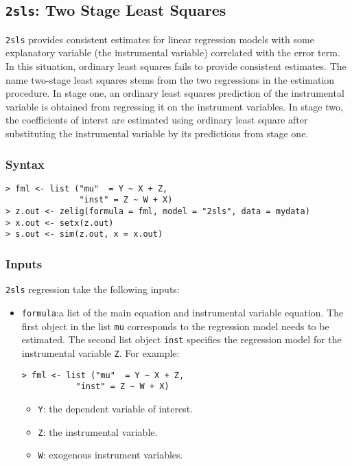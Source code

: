 \documentclass[12pt]{book}%
\begin{document}
\subsection{\texttt{2sls}: Two Stage Least Squares}
\label{2sls}
\texttt{2sls} provides consistent estimates for linear regression models with 
some explanatory variable (the instrumental variable) 
correlated with the error term. 
In this situation, ordinary least squares fails to provide consistent 
estimates. The name two-stage least squares stems from the two regressions 
in the estimation procedure. In stage one, an ordinary least squares 
prediction of the instrumental variable is obtained from regressing it on
the instrument variables. In stage two, the coefficients of interst are 
estimated using ordinary least square after substituting the instrumental 
variable by its predictions from stage one. 

\subsubsection{Syntax}
\begin{verbatim}
> fml <- list ("mu"  = Y ~ X + Z,
               "inst" = Z ~ W + X)
> z.out <- zelig(formula = fml, model = "2sls", data = mydata)
> x.out <- setx(z.out)
> s.out <- sim(z.out, x = x.out)
\end{verbatim}
\subsubsection{Inputs}
\texttt{2sls} regression take the following inputs:
\begin{itemize}
\item \texttt{formula}:a list of the main equation and instrumental variable 
equation. The first object in the list \texttt{mu} corresponds to the 
regression model needs to be estimated. The second list object \texttt{inst} 
specifies the regression model for the instrumental variable \texttt{Z}.
For example:
\begin{verbatim}
> fml <- list ("mu"  = Y ~ X + Z,
	       "inst" = Z ~ W + X)
\end{verbatim}
\begin{itemize}
\item \texttt{Y}: the dependent variable of interest.
\item \texttt{Z}: the instrumental variable.
\item \texttt{W}: exogenous instrument variables.
\end{itemize}
\end{itemize}
\end{document}
